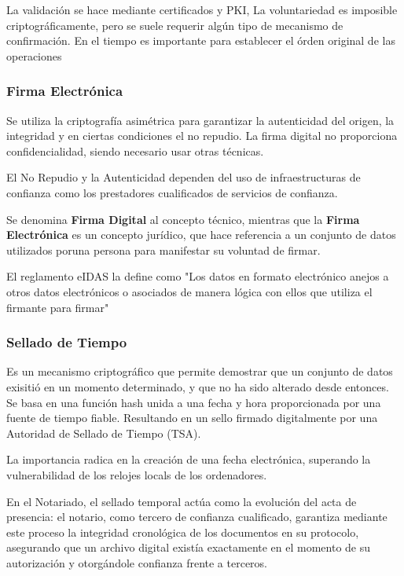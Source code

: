     La validación se hace mediante certificados y PKI, La voluntariedad es imposible criptográficamente, pero se suele requerir algún tipo de mecanismo de confirmación. En el tiempo es importante para establecer el órden original de las operaciones

    \subsubsection{Firma Electrónica}
        Se utiliza la criptografía asimétrica para garantizar la autenticidad del origen, la integridad y en ciertas condiciones el no repudio. La firma digital no proporciona confidencialidad, siendo necesario usar otras técnicas.

        El No Repudio y la Autenticidad dependen del uso de infraestructuras de confianza como los prestadores cualificados de servicios de confianza.

        Se denomina \textbf{Firma Digital} al concepto técnico, mientras que la \textbf{Firma Electrónica} es un concepto jurídico, que hace referencia a un conjunto de datos utilizados poruna persona para manifestar su voluntad de firmar.

        El reglamento eIDAS la define como "Los datos en formato electrónico anejos a otros datos electrónicos o asociados de manera lógica con ellos que utiliza el firmante para firmar"

    \subsubsection{Sellado de Tiempo}
        Es un mecanismo criptográfico que permite demostrar que un conjunto de datos exisitió en un momento determinado, y que no ha sido alterado desde entonces. Se basa en una función hash unida a una fecha y hora proporcionada por una fuente de tiempo fiable. Resultando en un sello firmado digitalmente por una Autoridad de Sellado de Tiempo (TSA).

        La importancia radica en la creación de una fecha electrónica, superando la vulnerabilidad de los relojes locals de los ordenadores.

        En el Notariado, el sellado temporal actúa como la evolución del acta de presencia: el notario, como tercero de confianza cualificado, garantiza mediante este proceso la integridad cronológica de los documentos en su protocolo, asegurando que un archivo digital existía exactamente en el momento de su autorización y otorgándole confianza frente a terceros.

